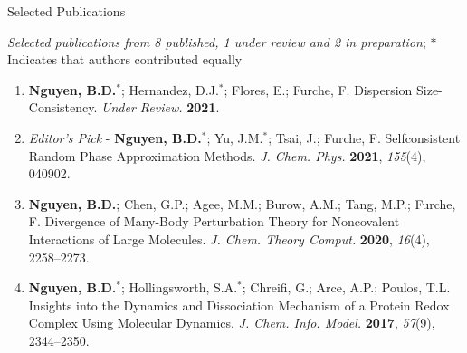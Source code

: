 \documentclass{resume} %
\begin{document}
\begin{rSection}{Selected Publications}

  \textit{Selected publications from 8 published, 1 under review and
    2 in preparation};  
  $*$ Indicates that authors contributed equally
  
\begin{enumerate}
\item \textbf{Nguyen, B.D.}$^*$; Hernandez, D.J.$^*$;
  Flores, E.; Furche, F. Dispersion Size-Consistency. \textit{Under Review.}
  \textbf{2021}.

\item {\em Editor's Pick} - \textbf{Nguyen, B.D.}$^*$; Yu, J.M.$^*$; Tsai, J.;
  Furche, F. Selfconsistent Random Phase Approximation Methods.
  \textit{J. Chem. Phys.} \textbf{2021}, \textit{155}(4), 040902.

%
      
\item \textbf{Nguyen, B.D.}; Chen, G.P.; Agee, M.M.; Burow, A.M.; Tang, M.P.;
  Furche, F. Divergence of Many-Body Perturbation Theory for Noncovalent Interactions
  of Large Molecules. \textit{J. Chem. Theory Comput.} \textbf{2020}, \textit{16}(4),
  2258--2273.

\item \textbf{Nguyen, B.D.}$^*$; Hollingsworth, S.A.$^*$; Chreifi, G.;
  Arce, A.P.; Poulos, T.L. Insights into the Dynamics and Dissociation Mechanism
  of a Protein Redox Complex Using Molecular Dynamics. \textit{J. Chem. Info. Model.}
  \textbf{2017}, \textit{57}(9), 2344--2350.

%
%
  
\end{enumerate}

\end{rSection}
\end{document}
